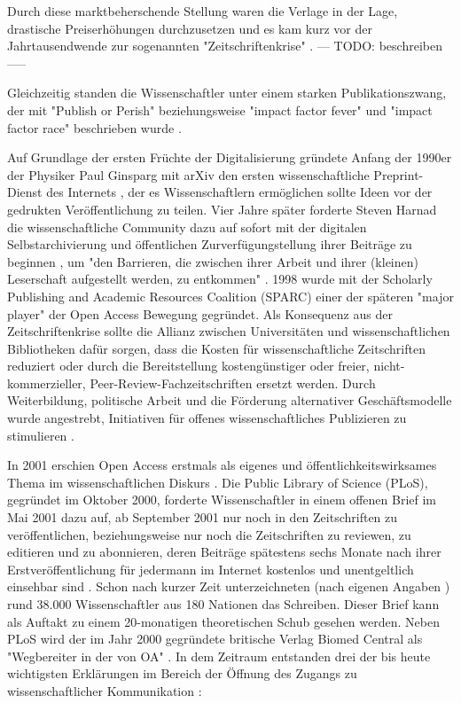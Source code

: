 Durch diese marktbeherschende Stellung waren die Verlage in der Lage, drastische Preiserhöhungen durchzusetzen und es kam kurz vor der Jahrtausendwende zur sogenannten "Zeitschriftenkrise" \cite{suchen}. --- TODO: beschreiben -----

Gleichzeitig standen die Wissenschaftler unter einem starken Publikationszwang, der mit "Publish or Perish" \cite{CLAPHAM_2005} beziehungsweise "impact factor fever" \cite{Cherubini_2008} und "impact factor race" \cite{Brischoux_2009} beschrieben wurde \cite{offhaus_2012_institutionelle_repos}. 

Auf Grundlage der ersten Früchte der Digitalisierung gründete Anfang der 1990er der Physiker Paul Ginsparg mit arXiv den ersten wissenschaftliche Preprint-Dienst des Internets \cite{suchen}, der es Wissenschaftlern ermöglichen sollte Ideen vor der gedrukten Veröffentlichung zu teilen. Vier Jahre später forderte Steven Harnad die wissenschaftliche Community dazu auf sofort mit der digitalen Selbstarchivierung und öffentlichen Zurverfügungstellung ihrer Beiträge zu beginnen \cite{albert_2006_open_implications}, um "den Barrieren, die zwischen ihrer Arbeit und ihrer (kleinen) Leserschaft aufgestellt werden, zu entkommen" \cite{harnad_1995_subversive_proposal}. 1998 wurde mit der Scholarly Publishing and Academic Resources Coalition (SPARC) einer der späteren "major player" der Open Access Bewegung\cite{russell2008business} \cite{Herb_2012} gegründet. Als Konsequenz aus der Zeitschriftenkrise sollte die Allianz zwischen Universitäten und wissenschaftlichen Bibliotheken dafür sorgen, dass die Kosten für wissenschaftliche Zeitschriften reduziert oder durch die Bereitstellung kostengünstiger oder freier, nicht-kommerzieller, Peer-Review-Fachzeitschriften ersetzt werden. Durch Weiterbildung, politische Arbeit und die Förderung alternativer Geschäftsmodelle wurde angestrebt, Initiativen für offenes wissenschaftliches Publizieren zu stimulieren \cite{suchen}.

In 2001 erschien Open Access erstmals als eigenes und öffentlichkeitswirksames Thema im wissenschaftlichen Diskurs \cite{cite:19}. Die Public Library of Science (PLoS), gegründet im Oktober 2000, forderte Wissenschaftler in einem offenen Brief im Mai 2001 dazu auf, ab September 2001 nur noch in den Zeitschriften zu veröffentlichen, beziehungsweise nur noch die Zeitschriften zu reviewen, zu editieren und zu abonnieren, deren Beiträge spätestens sechs Monate nach ihrer Erstveröffentlichung für jedermann im Internet kostenlos und unentgeltlich einsehbar sind \cite{cite:20}. Schon nach kurzer Zeit unterzeichneten (nach eigenen Angaben \cite{cite:19a}) rund 38.000 Wissenschaftler aus 180 Nationen das Schreiben. Dieser Brief kann als Auftakt zu einem 20-monatigen theoretischen Schub gesehen werden. Neben PLoS wird der im Jahr 2000 gegründete britische Verlag Biomed Central als "Wegbereiter in der von OA" \cite{suchen-Hoffmann-Zugang-undVerwertung-öffentlicher-Informationen}. In dem Zeitraum entstanden drei der bis heute wichtigsten Erklärungen im Bereich der Öffnung des Zugangs zu wissenschaftlicher Kommunikation \cite{CREATe_2014}: 

